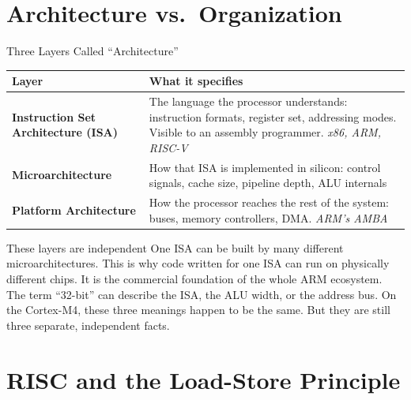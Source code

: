 \documentclass[9pt,aspectratio=169,xcolor=table]{beamer}
\begin{document}
\section{Architecture vs.\ Organization}

\begin{frame}{Three Layers Called ``Architecture''}
    \leavevmode
    \begin{center}
    {\small
    \striped
    \begin{tabular}{@{}l R{.58\textwidth}@{}}
        \toprule
        \textbf{Layer} & \textbf{What it specifies} \\
        \midrule
        \textbf{Instruction Set Architecture (ISA)}
            & The language the processor understands: instruction formats,
              register set, addressing modes. Visible to an assembly programmer.
              \emph{x86, ARM, RISC-V} \\[2mm]
        \textbf{Microarchitecture}
            & How that ISA is implemented in silicon: control signals, cache
              size, pipeline depth, ALU internals \\[2mm]
        \textbf{Platform Architecture}
            & How the processor reaches the rest of the system: buses, memory controllers,
              DMA. \emph{ARM's AMBA} \\
        \bottomrule
    \end{tabular}}
    \end{center}
    \vspace{2mm}
    \begin{block}{These layers are independent}
        One ISA can be built by many different microarchitectures. This is why code written for one ISA can run on physically different chips. It is the commercial foundation of the whole ARM ecosystem.
        \vspace{1mm}
        The term ``32-bit'' can describe the ISA, the ALU width, or the address bus. On the Cortex-M4, these three meanings happen to be the same. But they are still three separate, independent facts.
    \end{block}
\end{frame}


\section{RISC and the Load-Store Principle}
\end{document}
